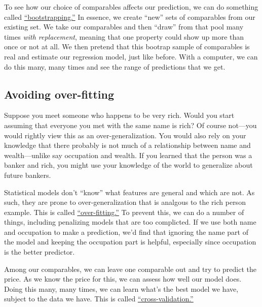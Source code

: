 \documentclass[
12pt, %
letterpaper, %
oneside, %
headinclude,footinclude, %
BCOR5mm, %
]{scrartcl}
\begin{document}
To see how our choice of comparables affects our prediction, we can do something called \href{https://en.wikipedia.org/wiki/Bootstrapping_(statistics)}{``bootstrapping.''}
In essence, we create ``new'' sets of comparables from our existing set.
We take our comparables and then ``draw'' from that pool many times \emph{with replacement}, meaning that one property could show up more than once or not at all.
We then pretend that this bootrap sample of comparables is real and estimate our regression model, just like before.
With a computer, we can do this many, many times and see the range of predictions that we get. 

\subsection{Avoiding over-fitting} \label{sec:regularization}
Suppose you meet someone who happens to be very rich.
Would you start assuming that everyone you met with the same name is rich?
Of course not---you would rightly view this as an over-generalization.
You would also rely on your knowledge that there probably is not much of a relationship between name and wealth---unlike say occupation and wealth.
If you learned that the person was a banker and rich, you might use your knowledge of the world to generalize about future bankers.

Statistical models don't ``know'' what features are general and which are not.
As such, they are prone to over-generalization that is analgous to the rich person example. 
This is called \href{https://en.wikipedia.org/wiki/Overfitting}{``over-fitting.''}
To prevent this, we can do a number of things, including penalizing models that are too complicted.
If we use both name and occupation to make a prediction, we'd find that ignoring the name part of the model and keeping the occupation part is helpful, especially since occupation is the better predictor. 

Among our comparables, we can leave one comparable out and try to predict the price.
As we know the price for this, we can assess how well our model does.
Doing this many, many times, we can learn what's the best model we have, subject to the data we have.
This is called \href{https://en.wikipedia.org/wiki/Cross-validation_(statistics)}{``cross-validation.''}

\end{document}
